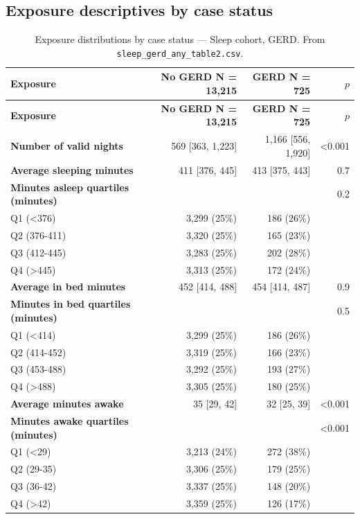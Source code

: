 \documentclass[11pt]{article}
\newcommand{\code}[1]{\texttt{\small #1}}
\begin{document}
\subsection{Exposure descriptives by case status}
\footnotesize\begin{longtable}{@{}p{6.4cm}rrr@{}}
\caption{Exposure distributions by case status --- Sleep cohort, GERD. From \code{sleep\_gerd\_any\_table2.csv}.}\label{tab:appM-t2-sleep-gerd-any}\\
\toprule \textbf{Exposure} & \textbf{No GERD     N = 13,215} & \textbf{GERD     N = 725} & \textbf{$p$} \\ \midrule \endfirsthead
\toprule \textbf{Exposure} & \textbf{No GERD     N = 13,215} & \textbf{GERD     N = 725} & \textbf{$p$} \\ \midrule \endhead
\textbf{Number of valid nights} & 569 [363, 1,223] & 1,166 [556, 1,920] & <0.001 \\
\textbf{Average sleeping minutes} & 411 [376, 445] & 413 [375, 443] & 0.7 \\
\textbf{Minutes asleep quartiles (minutes)} &  &  & 0.2 \\
\quad Q1 (<376) & 3,299 (25\%) & 186 (26\%) &  \\
\quad Q2 (376-411) & 3,320 (25\%) & 165 (23\%) &  \\
\quad Q3 (412-445) & 3,283 (25\%) & 202 (28\%) &  \\
\quad Q4 (>445) & 3,313 (25\%) & 172 (24\%) &  \\
\textbf{Average in bed minutes} & 452 [414, 488] & 454 [414, 487] & 0.9 \\
\textbf{Minutes in bed quartiles (minutes)} &  &  & 0.5 \\
\quad Q1 (<414) & 3,299 (25\%) & 186 (26\%) &  \\
\quad Q2 (414-452) & 3,319 (25\%) & 166 (23\%) &  \\
\quad Q3 (453-488) & 3,292 (25\%) & 193 (27\%) &  \\
\quad Q4 (>488) & 3,305 (25\%) & 180 (25\%) &  \\
\textbf{Average minutes awake} & 35 [29, 42] & 32 [25, 39] & <0.001 \\
\textbf{Minutes awake quartiles (minutes)} &  &  & <0.001 \\
\quad Q1 (<29) & 3,213 (24\%) & 272 (38\%) &  \\
\quad Q2 (29-35) & 3,306 (25\%) & 179 (25\%) &  \\
\quad Q3 (36-42) & 3,337 (25\%) & 148 (20\%) &  \\
\quad Q4 (>42) & 3,359 (25\%) & 126 (17\%) &  \\

\end{longtable}
\end{document}
